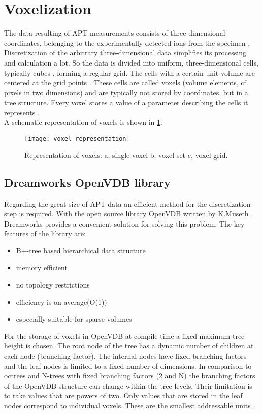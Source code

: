 \section{Voxelization}
\label{voxelization}

The data resulting of APT-measurements consists of three-dimensional coordinates, belonging to the experimentally detected ions from the specimen \cite{Hel02}. Discretization of the arbitrary three-dimensional data simplifies its processing and calculation a lot.
So the data is divided into uniform, three-dimensional cells, typically cubes \cite{Geb06}, forming a regular grid. The cells with a certain unit volume are centered at the grid points \cite{Wan94}. These cells are called voxels (volume elements, cf. pixels in two dimensions) and are typically not stored by coordinates, but in a tree structure. Every voxel stores a value of a parameter describing the cells it represents \cite[p. 127]{Joh04}.\\
A schematic representation of voxels  is shown in \cref{fig:voxel_repr}.

\begin{figure}[H]
	\centering
	\texttt{[image: voxel\_representation]}
	\caption{Representation of voxels: a, single voxel b, voxel set c, voxel grid. \label{fig:voxel_repr}}
\end{figure}

\subsection{Dreamworks OpenVDB library}
\label{dreamworks}
Regarding the great size of APT-data an efficient method for the discretization step is required.
With the open source library OpenVDB written by K.Museth \cite{Mus13}, Dreamworks provides a convenient solution for solving this problem.
The key features of the library are:
\begin{itemize}
\item B+-tree based hierarchical data structure
\item memory efficient
\item no topology restrictions
\item efficiency is on average(O(1))
\item especially suitable for sparse volumes
\end{itemize}

For the storage of voxels in OpenVDB at compile time a fixed maximum tree height is chosen. The root node of the tree has a dynamic number of children at each node (branching factor). The internal nodes have fixed branching factors and the leaf nodes is limited to a fixed number of dimensions. In comparison to octrees and N-trees with fixed branching factors (2 and N) the branching factors of the OpenVDB structure can change within the tree levels. Their limitation is to take values that are powers of two.
Only values that are stored in the leaf nodes correspond to individual voxels. These are the smallest addressable units \cite{OpenVDB}.     


